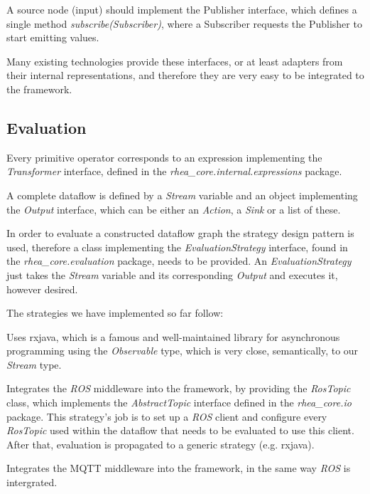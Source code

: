 \documentclass[sigplan,review,anonymous]{acmart}\settopmatter{printfolios=true,printacmref=false}
\begin{document}
A source node (input) should implement the Publisher interface, which defines a single method \textit{subscribe(Subscriber)}, where a Subscriber requests the Publisher to start emitting values.

Many existing technologies provide these interfaces, or at least adapters from their internal representations, and therefore they are very easy to be integrated to the framework.

\subsection{Evaluation}

Every primitive operator corresponds to an expression implementing the \textit{Transformer} interface, defined in the \textit{rhea\_core.internal.expressions} package.

A complete dataflow is defined by a \textit{Stream} variable and an object implementing the \textit{Output} interface, which can be either an \textit{Action}, a \textit{Sink} or a list of these.

In order to evaluate a constructed dataflow graph the strategy design pattern is used, therefore a class implementing the \textit{EvaluationStrategy} interface, found in the \textit{rhea\_core.evaluation} package, needs to be provided. An \textit{EvaluationStrategy} just takes the \textit{Stream} variable and its corresponding \textit{Output} and executes it, however desired.

The strategies we have implemented so far follow:

\begin{description}[style=nextline]
\item[RxJavaEvaluationStrategy]
Uses rxjava, which is a famous and well-maintained library for asynchronous programming using the \textit{Observable} type, which is very close, semantically, to our \textit{Stream} type.

\item[RosEvaluationStrategy]
Integrates the \textit{ROS} middleware into the framework, by providing the \textit{RosTopic} class, which implements the \textit{AbstractTopic} interface defined in the \textit{rhea\_core.io} package. This strategy's job is to set up a \textit{ROS} client and configure every \textit{RosTopic} used within the dataflow that needs to be evaluated to use this client. After that, evaluation is propagated to a generic strategy (e.g. rxjava).

\item[MqttEvaluationStrategy]
Integrates the MQTT middleware into the framework, in the same way \textit{ROS} is intergrated.
\end{description}
\end{document}
